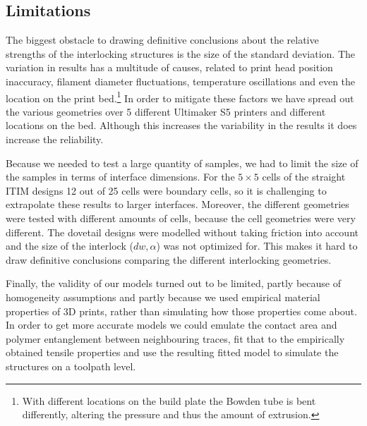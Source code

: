 \subsection{Limitations}
The biggest obstacle to drawing definitive conclusions about the relative strengths of the interlocking structures is the size of the standard deviation.
The variation in results has a multitude of causes, related to print head position inaccuracy, filament diameter fluctuations, temperature oscillations and even the location on the print bed.\footnote{With different locations on the build plate the Bowden tube is bent differently, altering the pressure and thus the amount of extrusion.}
In order to mitigate these factors we have spread out the various geometries over 5 different Ultimaker S5 printers and different locations on the bed.
Although this increases the variability in the results it does increase the reliability.

Because we needed to test a large quantity of samples, we had to limit the size of the samples in terms of interface dimensions.
For the $5\times5$ cells of the straight ITIM designs 12 out of 25 cells were boundary cells, so it is challenging to extrapolate these results to larger interfaces.
Moreover, the different geometries were tested with different amounts of cells, because the cell geometries were very different.
The dovetail designs were modelled without taking friction into account and the size of the interlock ($dw, \alpha$) was not optimized for.
This makes it hard to draw definitive conclusions comparing the different interlocking geometries.

Finally, the validity of our models turned out to be limited,
partly because of homogeneity assumptions and partly because we used empirical material properties of 3D prints, rather than simulating how those properties come about.
In order to get more accurate models we could emulate the contact area and polymer entanglement between neighbouring traces,
fit that to the empirically obtained tensile properties and use the resulting fitted model to simulate the structures on a toolpath level.
